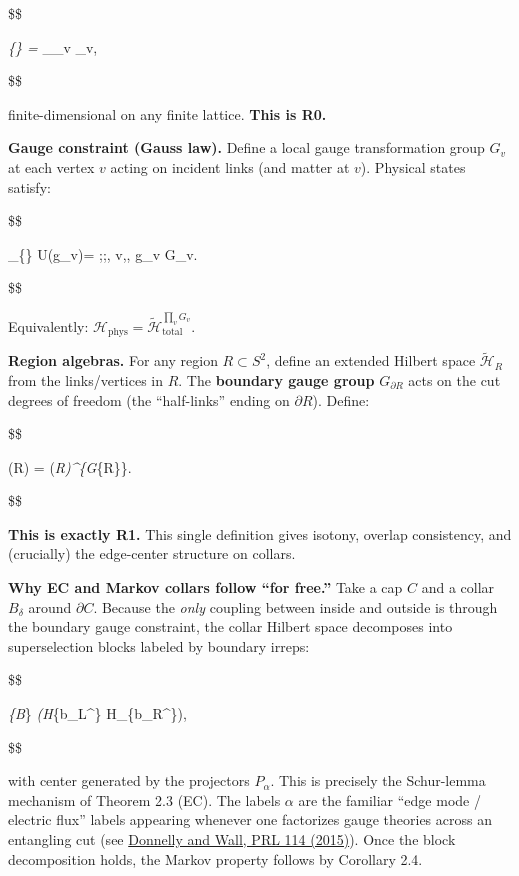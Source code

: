 \documentclass[11pt,a4paper]{article}
\theoremstyle{remark}
\begin{document}
\$\$

\emph{\{\} = \bigotimes}\ell {}\_\ell \otimes \bigotimes\_v \_v,

\$\$

finite-dimensional on any finite lattice. \textbf{This is R0.}

\textbf{Gauge constraint (Gauss law).} Define a local gauge transformation group
\(G_v\) at each vertex \(v\) acting on incident links (and matter at \(v\)). Physical
states satisfy:

\$\$

\textbar{}\psi\rangle \in {}\_\{\} \quad\Longleftrightarrow\quad U(g\_v)\textbar{}\psi\rangle = \textbar{}\psi\rangle ;;\forall, v,, g\_v \in G\_v.

\$\$

Equivalently: \(\mathcal{H}_{\mathrm{phys}} = \tilde{\mathcal{H}}_{\mathrm{total}}^{\prod_v G_v}\).

\textbf{Region algebras.} For any region \(R \subset S^2\), define an extended Hilbert
space \(\tilde{\mathcal{H}}_R\) from the links/vertices in \(R\). The \textbf{boundary
gauge group} \(G_{\partial R}\) acts on the cut degrees of freedom (the
``half-links'' ending on \(\partial R\)). Define:

\$\$

(R) = (\emph{R)\^{}\{G}\{\partial R\}\}.

\$\$

\textbf{This is exactly R1.} This single definition gives isotony, overlap
consistency, and (crucially) the edge-center structure on collars.

\textbf{Why EC and Markov collars follow ``for free.''} Take a cap \(C\) and a collar
\(B_\delta\) around \(\partial C\). Because the \emph{only} coupling between inside
and outside is through the boundary gauge constraint, the collar Hilbert
space decomposes into superselection blocks labeled by boundary irreps:

\$\$

\emph{\{B}\delta\} \cong \bigoplus\emph{\alpha (H}\{b\_L\^{}\alpha\} \otimes H\_\{b\_R\^{}\alpha\}),

\$\$

with center generated by the projectors \(P_\alpha\). This is precisely the
Schur-lemma mechanism of Theorem 2.3 (EC). The labels \(\alpha\) are the
familiar ``edge mode / electric flux'' labels appearing whenever one
factorizes gauge theories across an entangling cut (see
\href{https://link.aps.org/doi/10.1103/PhysRevLett.114.111603}{Donnelly and Wall, PRL 114 (2015)}).
Once the block decomposition holds, the Markov property follows by
Corollary 2.4.
\end{document}
